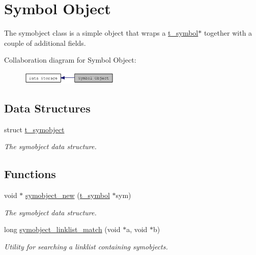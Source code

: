 \hypertarget{group__symobject}{
\section{Symbol Object}
\label{group__symobject}
}


The symobject class is a simple object that wraps a \hyperlink{structt__symbol}{t\_\-symbol}$\ast$ together with a couple of additional fields.  


Collaboration diagram for Symbol Object:\nopagebreak
\begin{figure}[H]
\begin{center}
\leavevmode
\includegraphics[width=132pt]{group__symobject}
\end{center}
\end{figure}
\subsection*{Data Structures}
\begin{DoxyCompactItemize}
\item 
struct \hyperlink{structt__symobject}{t\_\-symobject}
\begin{DoxyCompactList}\small\item\em The symobject data structure. \item\end{DoxyCompactList}\end{DoxyCompactItemize}
\subsection*{Functions}
\begin{DoxyCompactItemize}
\item 
void $\ast$ \hyperlink{group__symobject_gac66ae5925bb38fa0914f14dcc8172e2d}{symobject\_\-new} (\hyperlink{structt__symbol}{t\_\-symbol} $\ast$sym)
\begin{DoxyCompactList}\small\item\em The symobject data structure. \item\end{DoxyCompactList}\item 
long \hyperlink{group__symobject_gaff1afdf1da1b882e7314874bbf44921e}{symobject\_\-linklist\_\-match} (void $\ast$a, void $\ast$b)
\begin{DoxyCompactList}\small\item\em Utility for searching a linklist containing symobjects. \item\end{DoxyCompactList}\end{DoxyCompactItemize}


